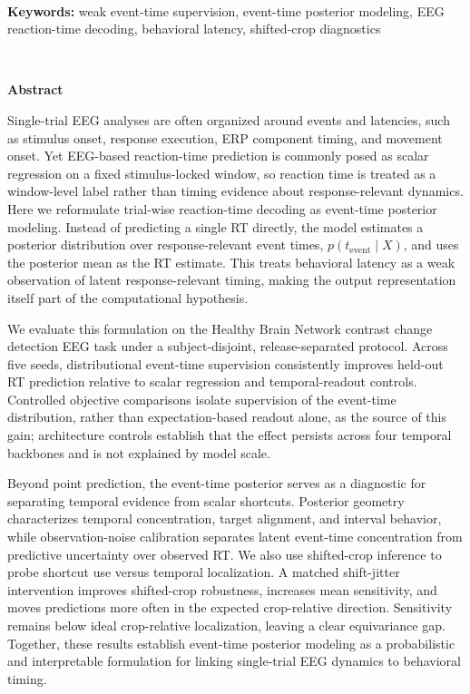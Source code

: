 \documentclass[12pt]{article}
\begin{document}
\ \\[-2mm]
{\bf Keywords:} weak event-time supervision, event-time posterior modeling, EEG reaction-time decoding, behavioral latency, shifted-crop diagnostics

\thispagestyle{empty}
%
\ \vspace{-0mm}\\
%
\begin{center} {\bf Abstract} \end{center}



Single-trial EEG analyses are often organized around events and latencies, such as stimulus onset, response execution, ERP component timing, and movement onset. Yet EEG-based reaction-time prediction is commonly posed as scalar regression on a fixed stimulus-locked window, so reaction time is treated as a window-level label rather than timing evidence about response-relevant dynamics. Here we reformulate trial-wise reaction-time decoding as event-time posterior modeling. Instead of predicting a single RT directly, the model estimates a posterior distribution over response-relevant event times, \(p(t_{\mathrm{event}}\mid X)\), and uses the posterior mean as the RT estimate. This treats behavioral latency as a weak observation of latent response-relevant timing, making the output representation itself part of the computational hypothesis.

We evaluate this formulation on the Healthy Brain Network contrast change detection EEG task under a subject-disjoint, release-separated protocol. Across five seeds, distributional event-time supervision consistently improves held-out RT prediction relative to scalar regression and temporal-readout controls. Controlled objective comparisons isolate supervision of the event-time distribution, rather than expectation-based readout alone, as the source of this gain; architecture controls establish that the effect persists across four temporal backbones and is not explained by model scale.

Beyond point prediction, the event-time posterior serves as a diagnostic for separating temporal evidence from scalar shortcuts. Posterior geometry characterizes temporal concentration, target alignment, and interval behavior, while observation-noise calibration separates latent event-time concentration from predictive uncertainty over observed RT. We also use shifted-crop inference to probe shortcut use versus temporal localization. A matched shift-jitter intervention improves shifted-crop robustness, increases mean sensitivity, and moves predictions more often in the expected crop-relative direction. Sensitivity remains below ideal crop-relative localization, leaving a clear equivariance gap. Together, these results establish event-time posterior modeling as a probabilistic and interpretable formulation for linking single-trial EEG dynamics to behavioral timing.
\end{document}
